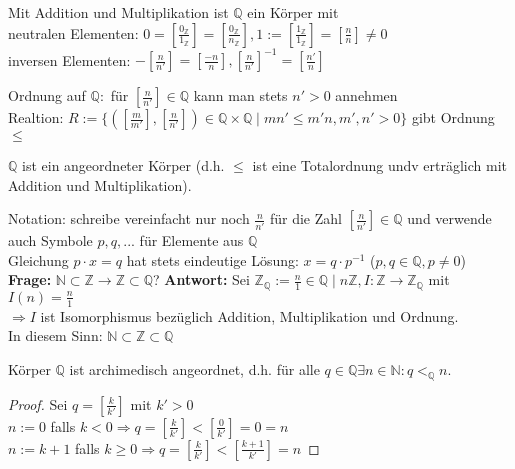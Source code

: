 \begin{satz}
	Mit Addition und Multiplikation ist $\mathbb Q$ ein Körper mit\\
		neutralen Elementen: $0=[\frac{0_{\mathbb Z}}{1_{\mathbb Z}}]=
		[\frac{0_{\mathbb Z}}{n_{\mathbb Z}}], 1:=[\frac{1_{\mathbb Z}}{1_{\mathbb Z}}]=[\frac n n] \neq 0$\\
		inversen Elementen: $-[\frac{n}{n'}]=[\frac{-n}{n}], [\frac{n}{n'}]^{-1}=[\frac{n'}{n}]$\\
\end{satz}

\noindent Ordnung auf $\mathbb Q:$ f\"ur $[\frac{n}{n'}] \in \mathbb Q$ kann man stets $n'>0$ annehmen \\
Realtion: $R:=\{([\frac{m}{m'}],[\frac{n}{n'}]) \in \mathbb Q \times \mathbb Q \mid mn' \le m'n, 
m',n' > 0\}$ gibt Ordnung $\le$ \\

\begin{satz}
	$\mathbb Q$ ist ein angeordneter K\"orper (d.h. $\le$ ist eine Totalordnung undv erträglich mit Addition und Multiplikation).
\end{satz}

Notation: schreibe vereinfacht nur noch $\frac{n}{n'}$ für die Zahl $[\frac{n}{n'}] \in \mathbb Q$ und verwende auch Symbole $p,q,...$ für Elemente aus $\mathbb Q$ \\

Gleichung $p \cdot x = q$ hat stets eindeutige Lösung: $x=q \cdot p^{-1}$ ($p,q \in \mathbb Q, p \neq 0$) \\

\textbf{Frage:} $\mathbb N \subset \mathbb Z \to \mathbb Z \subset \mathbb Q$?
\textbf{Antwort:} Sei $\mathbb Z_{\mathbb Q} := {\frac n 1 \in \mathbb Q \mid n \mathbb Z}, I:
\mathbb Z \to \mathbb Z_{\mathbb Q}$ mit $I(n)=\frac n 1$ \\
$\Rightarrow I$ ist Isomorphismus bez\"uglich Addition, Multiplikation und Ordnung. \\
In diesem Sinn: $\mathbb N \subset \mathbb Z \subset \mathbb Q$ \\

\begin{folg}
	Körper $\mathbb Q$ ist archimedisch angeordnet, d.h. f\"ur alle $q \in \mathbb Q \exists n \in \mathbb N: q<_{\mathbb Q} n.$
\end{folg}

\begin{proof}
	Sei $q = [\frac{k}{k'}]$ mit $k'>0$ \\
	$n := 0$ falls $k<0 \Rightarrow q=[\frac{k}{k'}] < [\frac{0}{k'}]=0=n$ \\
	$n := k+1$ falls $k \ge 0 \Rightarrow q=[\frac{k}{k'}] < [\frac{k+1}{k'}]=n$ \QEDA
\end{proof}
